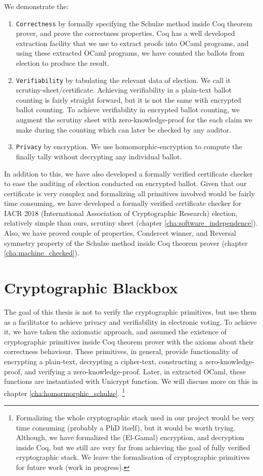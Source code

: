 We demonstrate the:
\begin{enumerate}
 \item \texttt{Correctness} by formally specifying the Schulze method  inside 
 Coq theorem prover, and prove the correctness properties. 
 Coq has a well developed extraction facility that 
 we use to extract proofs into OCaml programs, and using these extracted OCaml programs, we 
 have counted the ballots from election to produce the result. 
 \item \texttt{Verifiability} by tabulating the relevant data of election. We call it scrutiny-sheet/certificate. 
   Achieving verifiability in a plain-text ballot counting is fairly straight forward, but it is not 
   the same with encrypted ballot counting.  To achieve verifiability in encrypted ballot counting, 
   we augment the scrutiny sheet with zero-knowledge-proof for the each claim we make during the 
   counting which can  later be checked by any auditor.  
 \item \texttt{Privacy} by encryption. We use homomorphic-encryption to compute the 
  finally tally without decrypting any individual ballot. 
\end{enumerate}


In addition to this, we have also developed a formally verified certificate checker to ease the 
auditing of election conducted on encrypted ballot.  Given that our certificate is very complex 
and formalizing all primitives involved would be fairly time consuming, we have developed a 
formally verified certificate checker for IACR 2018 (International Association of Cryptographic Research) election, 
relatively simple than ours, scrutiny sheet
(chapter \ref{cha:software_independence}). 
Also, we have proved couple of properties, Condercet winner, and Reversal symmetry property 
of the Schulze method inside Coq theorem prover (chapter \ref{cha:machine_checked}). 

\section{Cryptographic Blackbox}
The goal of this thesis is not to verify the cryptographic primitives, but use them as a 
facilitator to achieve privacy and verifiability in electronic voting. To achieve it, we have 
taken the axiomatic approach, and assumed the existence of cryptographic primitives 
inside Coq theorem prover with the 
axioms about their correctness behaviour. These primitives, in general, provide functionality 
of encrypting a plain-text, decrypting a cipher-text, constructing a zero-knowledge-proof, 
and verifying a zero-knowledge-proof. Later, in extracted OCaml, these functions are instantiated 
with Unicrypt\citep{LocherH14} function.  We will discuss more on this in chapter
\ref{cha:homormorphic_schulze}.
\footnote{Formalizing the whole cryptographic stack used in our 
project would be very time consuming (probably a PhD itself), but it would be worth trying. 
Although, we have formalized the (El-Gamal) encryption, and decryption inside Coq, but we still 
are very far from achieving the goal of fully verified cryptographic stack.  We leave the formalisation 
of cryptographic primitives for future work (work in progress).}



